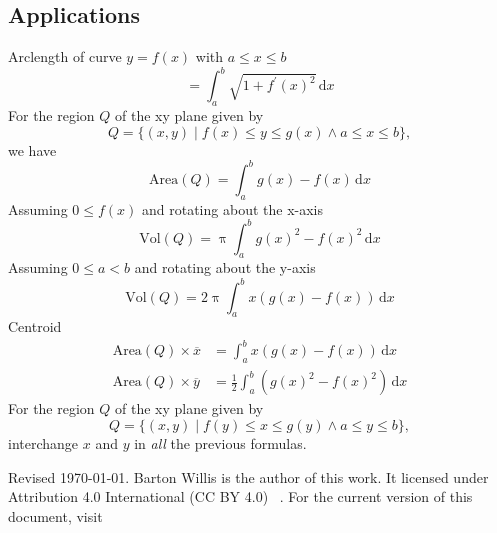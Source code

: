 \documentclass[letterpaper,9pt,fleqn]{extarticle}
\begin{document}
\begin{multicols*}{2}
\section*{Applications}
Arclength of curve \(y = f(x)\) with \(a \leq x \leq b\)
\[
   = \int_a^b \sqrt{1 + f^\prime(x)^2} \, \mathrm{d} x
\]
For the region \(Q\) of the xy plane given by
\[
   Q = \{(x,y) \mid f(x) \leq y \leq g(x) \land a \leq x \leq b \},
\]
we have
\[
  \mbox{Area}(Q) = \int_a^b g(x) - f(x) \, \mathrm{d} x
\]  
Assuming \(0 \leq f(x)\) and rotating about the \mbox{x-axis}
\[
  \mbox{Vol}(Q) = \uppi \int_a^b g(x)^2 - f(x)^2 \, \mathrm{d} x
\]
Assuming \(0 \leq a < b\) and rotating about the y-axis
\[
  \mbox{Vol}(Q) = 2 \uppi \int_a^b x (g(x)  - f(x)) \, \mathrm{d} x
\]
Centroid
\begin{align*}
    \mbox{Area}(Q) \times \overline{x} &=  \int_a^b x \left(g(x) - f(x) \right) \, \mathrm{d} x \\
     \mbox{Area}(Q) \times \overline{y} &=  \frac{1}{2} \int_a^b  \left (g(x)^2  - f(x)^2 \right) \, \mathrm{d} x
\end{align*}
For the region \(Q\) of the xy plane given by
\[
   Q = \{(x,y) \mid f(y) \leq x \leq g(y) \land a \leq y \leq b \},
\]
interchange \(x\) and \(y\) in \emph{all} the previous formulas. 
\begin{comment}
Specifically
we have
\[
  \mbox{Area}(Q) = \int_a^b g(y) - f(y) \, \mathrm{d} y
\]  
Assuming \(0 \leq f(y)\) and rotating about the \mbox{y-axis}
\[
  \mbox{Vol}(Q) = \uppi \int_a^b g(y)^2 - f(y)^2 \, \mathrm{d} y
\]
Assuming \(a \geq 0\) and rotating about the x-axis
\[
  \mbox{Vol}(Q) = 2 \uppi \int_a^b y (g(y)  - f(y)) \, \mathrm{d} y
\]
Centroid
\begin{align*}
    \mbox{Area}(Q) \times \overline{y} &=  \int_a^b y \left(g(y) - f(y) \right) \, \mathrm{d} y \\
     \mbox{Area}(Q) \times \overline{x} &=  \frac{1}{2} \int_a^b  \left (g(y)^2  - f(y)^2 \right) \, \mathrm{d} y
\end{align*}
\end{comment}
\vfill 

\noindent Revised \today. Barton Willis is the author of this work. It 
licensed under Attribution 4.0 International (CC BY 4.0) \,  . For the current version of
this document, visit \,  

\end{multicols*}
\end{document}
